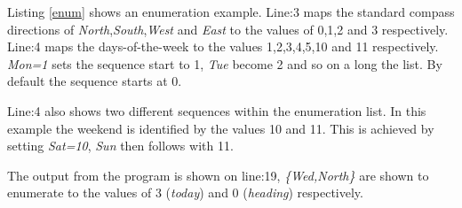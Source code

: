 Listing \ref{enum} shows an enumeration example. Line:3 maps the standard compass directions of \textit{North},\textit{South},\textit{West} and \textit{East} to the values of 0,1,2 and 3 respectively. Line:4 maps the days-of-the-week to the values 1,2,3,4,5,10 and 11 respectively. \textit{Mon=1} sets the sequence start to 1, \textit{Tue} become 2 and so on a long the list. By default the sequence starts at 0.

Line:4 also shows two different sequences within the enumeration list. In this example the weekend is identified by the values 10 and 11. This is achieved by setting \textit{Sat=10}, \textit{Sun} then follows with 11. 

The output from the program is shown on line:19, \textit{\{Wed,North\}} are shown to enumerate to the values of 3 (\textit{today}) and 0 (\textit{heading}) respectively.

